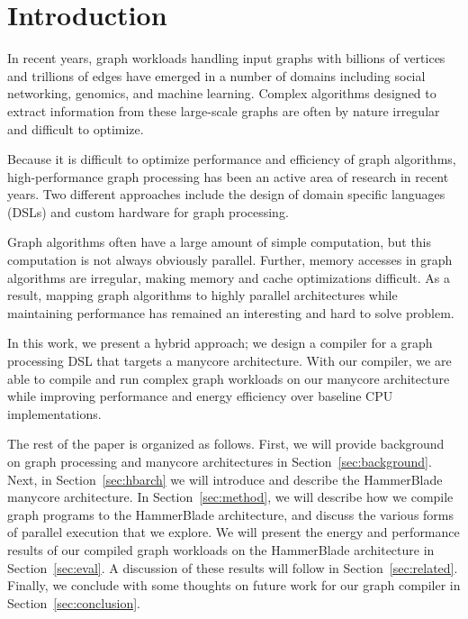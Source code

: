 
\section{Introduction} \label{sec:intro}
 
 In recent years, graph workloads handling input graphs with billions of vertices and trillions of edges have emerged in a number of domains including social networking, genomics, and machine learning. Complex algorithms designed to extract information from these large-scale graphs are often by nature irregular and difficult to optimize. 
 
Because it is difficult to optimize performance and efficiency of graph algorithms, high-performance graph processing has been an active area of research in recent years. Two different approaches include the design of domain specific languages (DSLs) and custom hardware for graph processing. 

Graph algorithms often have a large amount of simple computation, but this computation is not always obviously parallel. Further, memory accesses in graph algorithms are irregular, making memory and cache optimizations difficult. As a result, mapping graph algorithms to highly parallel architectures while maintaining performance has remained an interesting and hard to solve problem. 

In this work, we present a hybrid approach; we design a compiler for a graph processing DSL that targets a manycore architecture. With our compiler, we are able to compile and run complex graph workloads on our manycore architecture while improving performance and energy efficiency over baseline CPU implementations. 


The rest of the paper is organized as follows. 
First, we will provide background on graph processing and manycore architectures in Section~\ref{sec:background}.
Next, in Section~\ref{sec:hbarch} we will introduce and describe the HammerBlade manycore architecture. 
In Section~\ref{sec:method}, we will describe how we compile graph programs to the HammerBlade architecture, and discuss the various forms of parallel execution that we explore. 
We will present the energy and performance results of our compiled graph workloads on the HammerBlade architecture in Section~\ref{sec:eval}. 
A discussion of these results will follow in Section~\ref{sec:related}. 
Finally, we conclude with some thoughts on future work for our graph compiler in Section~\ref{sec:conclusion}. 
